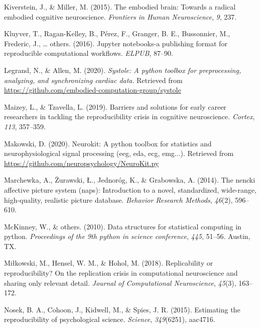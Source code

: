 \documentclass[
  english,
  man,floatsintext]{apa6}
\begin{document}
\leavevmode\hypertarget{ref-Kiverstein2015}{}%
Kiverstein, J., \& Miller, M. (2015). The embodied brain: Towards a radical embodied cognitive neuroscience. \emph{Frontiers in Human Neuroscience}, \emph{9}, 237.

\leavevmode\hypertarget{ref-kluyver2016jupyter}{}%
Kluyver, T., Ragan-Kelley, B., Pérez, F., Granger, B. E., Bussonnier, M., Frederic, J., \ldots{} others. (2016). Jupyter notebooks-a publishing format for reproducible computational workflows. \emph{ELPUB}, 87--90.

\leavevmode\hypertarget{ref-Systole}{}%
Legrand, N., \& Allen, M. (2020). \emph{Systole: A python toolbox for preprocessing, analyzing, and synchronizing cardiac data}. Retrieved from \url{https://github.com/embodied-computation-group/systole}

\leavevmode\hypertarget{ref-maizey2019barriers}{}%
Maizey, L., \& Tzavella, L. (2019). Barriers and solutions for early career researchers in tackling the reproducibility crisis in cognitive neuroscience. \emph{Cortex}, \emph{113}, 357--359.

\leavevmode\hypertarget{ref-neurokit1}{}%
Makowski, D. (2020). Neurokit: A python toolbox for statistics and neurophysiological signal processing (eeg, eda, ecg, emg...). Retrieved from \url{https://github.com/neuropsychology/NeuroKit.py}

\leavevmode\hypertarget{ref-marchewka2014nencki}{}%
Marchewka, A., Żurawski, Ł., Jednoróg, K., \& Grabowska, A. (2014). The nencki affective picture system (naps): Introduction to a novel, standardized, wide-range, high-quality, realistic picture database. \emph{Behavior Research Methods}, \emph{46}(2), 596--610.

\leavevmode\hypertarget{ref-pandas}{}%
McKinney, W., \& others. (2010). Data structures for statistical computing in python. \emph{Proceedings of the 9th python in science conference}, \emph{445}, 51--56. Austin, TX.

\leavevmode\hypertarget{ref-milkowski2018replicability}{}%
Miłkowski, M., Hensel, W. M., \& Hohol, M. (2018). Replicability or reproducibility? On the replication crisis in computational neuroscience and sharing only relevant detail. \emph{Journal of Computational Neuroscience}, \emph{45}(3), 163--172.

\leavevmode\hypertarget{ref-open2015estimating}{}%
Nosek, B. A., Cohoon, J., Kidwell, M., \& Spies, J. R. (2015). Estimating the reproducibility of psychological science. \emph{Science}, \emph{349}(6251), aac4716.
\end{document}
